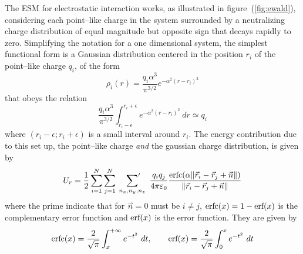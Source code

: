 The \ac{ESM} for electrostatic interaction works, as illustrated in figure~(\ref{fig:ewald}), considering each
point--like charge in the system surrounded by a neutralizing charge distribution of equal magnitude but opposite
sign that decays rapidly to zero. Simplifying the notation for a one dimensional system, the simplest functional
form is a Gaussian distribution centered in the position $r_i$ of the point--like charge $q_i$, of the form
\begin{equation}
	\rho_i(r) = \frac{q_i\alpha^3}{\pi^{3/2}}e^{-\alpha^2 (r - r_i)^2}
\end{equation}
that obeys the relation
\begin{equation*}
	\frac{q_i\alpha^3}{\pi^{3/2}}\int_{r_i-\epsilon}^{r_i+\epsilon}e^{-\alpha^2 (r - r_i)^2}\ dr \simeq q_i
\end{equation*}
where $(r_i-\epsilon; r_i+\epsilon)$ is a small interval around $r_i$. The energy contribution due to this set
up, the point--like charge \textit{and} the gaussian charge distribution, is given by
\begin{equation}
	U_r = \frac{1}{2}\sum_{i=1}^N\sum_{j=1}^N\ \sideset{}{'}\sum_{n_x,n_y,n_z}\ \frac{q_iq_j}{4 \pi \varepsilon_0} \frac{\erfc{(\alpha \| \vec r_i - \vec r_j + \vec n \|)}}{\| \vec r_i - \vec r_j + \vec n \|}
	\label{eq:ewaldReal}
\end{equation}
where the prime indicate that for $\vec n = 0$ must be $i\ne j$, $\text{erfc}(x) = 1-\text{erf}(x)$ is the complementary
error function and $\text{erf}(x)$ is the error function. They are given by
\begin{equation}
	\text{erfc}(x) = \frac{2}{\sqrt{\pi}}\int_{x}^{+\infty} e^{-t^2}\ dt, \qquad \text{erf}(x) = \frac{2}{\sqrt{\pi}}\int_{0}^{x} e^{-t^2}\ dt
	\label{eq:erf}
\end{equation}

